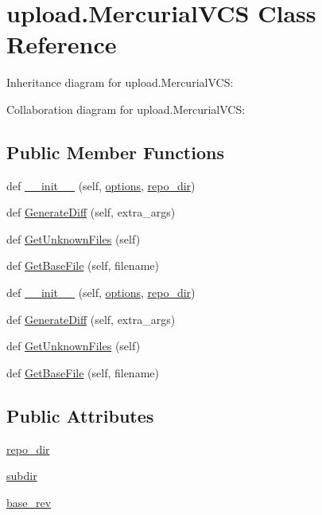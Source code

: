 \hypertarget{classupload_1_1_mercurial_v_c_s}{}\section{upload.\+Mercurial\+V\+CS Class Reference}
\label{classupload_1_1_mercurial_v_c_s}


Inheritance diagram for upload.\+Mercurial\+V\+CS\+:


Collaboration diagram for upload.\+Mercurial\+V\+CS\+:
\subsection*{Public Member Functions}
\begin{DoxyCompactItemize}
\item 
def \hyperlink{classupload_1_1_mercurial_v_c_s_a33890f442dedbb7d9fd45c08b5baed56}{\+\_\+\+\_\+init\+\_\+\+\_\+} (self, \hyperlink{classupload_1_1_version_control_system_a4d57d043bc408887b94269fe4cea9556}{options}, \hyperlink{classupload_1_1_mercurial_v_c_s_a219c1e0ab9ce864e3231913762ea489b}{repo\+\_\+dir})
\item 
def \hyperlink{classupload_1_1_mercurial_v_c_s_a6c05746012d8cd435c94ace1465671ef}{Generate\+Diff} (self, extra\+\_\+args)
\item 
def \hyperlink{classupload_1_1_mercurial_v_c_s_a6190899fb86cd09ad84cc5d4b0ebd2f3}{Get\+Unknown\+Files} (self)
\item 
def \hyperlink{classupload_1_1_mercurial_v_c_s_a0cdc0cbe6ac4daab82f5f01e6ae2e670}{Get\+Base\+File} (self, filename)
\item 
def \hyperlink{classupload_1_1_mercurial_v_c_s_a33890f442dedbb7d9fd45c08b5baed56}{\+\_\+\+\_\+init\+\_\+\+\_\+} (self, \hyperlink{classupload_1_1_version_control_system_a4d57d043bc408887b94269fe4cea9556}{options}, \hyperlink{classupload_1_1_mercurial_v_c_s_a219c1e0ab9ce864e3231913762ea489b}{repo\+\_\+dir})
\item 
def \hyperlink{classupload_1_1_mercurial_v_c_s_a6c05746012d8cd435c94ace1465671ef}{Generate\+Diff} (self, extra\+\_\+args)
\item 
def \hyperlink{classupload_1_1_mercurial_v_c_s_a6190899fb86cd09ad84cc5d4b0ebd2f3}{Get\+Unknown\+Files} (self)
\item 
def \hyperlink{classupload_1_1_mercurial_v_c_s_a0cdc0cbe6ac4daab82f5f01e6ae2e670}{Get\+Base\+File} (self, filename)
\end{DoxyCompactItemize}
\subsection*{Public Attributes}
\begin{DoxyCompactItemize}
\item 
\hyperlink{classupload_1_1_mercurial_v_c_s_a219c1e0ab9ce864e3231913762ea489b}{repo\+\_\+dir}
\item 
\hyperlink{classupload_1_1_mercurial_v_c_s_a0dad32e621f5523e3430d867184f0b42}{subdir}
\item 
\hyperlink{classupload_1_1_mercurial_v_c_s_a41faae7820d5a015f4a42476e5e4ab8c}{base\+\_\+rev}
\end{DoxyCompactItemize}


